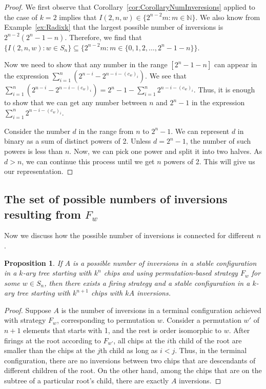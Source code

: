 \documentclass[final]{dmtcs-episciences}
\newtheorem{proposition}[theorem]{Proposition}
\theoremstyle{definition}
\theoremstyle{remark}
\begin{document}
\begin{proof}
We first observe that Corollary~\ref{cor:CorollaryNumInveresions} applied to the case of $k=2$ implies that $I(2, n, w) \in \{2^{n-2}m: m \in \mathbb{N}\}$. We also know from Example~\ref{ex:Radixk} that the largest possible number of inversions is $2^{n-2}(2^n-1-n)$. Therefore, we find that $\{I(2, n, w): w \in S_n\} \subseteq \{2^{n-2} m: m \in \{0, 1,2, \dots, 2^n-1-n\}\}$.

Now we need to show that any number in the range $[2^n-1-n]$ can appear in the expression $\sum_{i=1}^n (2^{n-i} - 2^{n-i-(c_w)_i})$.
We see that $\sum_{i=1}^n (2^{n-i} - 2^{n-i-(c_w)_i}) = 2^n-1 - \sum_{i=1}^n 2^{n-i-(c_w)_i}$. Thus, it is enough to show that we can get any number between $n$ and $2^n-1$ in the expression $\sum_{i=1}^n 2^{n-i-(c_w)_i}$.

Consider the number $d$ in the range from $n$ to $2^n-1$. We can represent $d$ in binary as a sum of distinct powers of 2. Unless $d=2^n-1$, the number of such powers is less than $n$. Now, we can pick one power and split it into two halves. As $d > n$, we can continue this process until we get $n$ powers of 2. This will give us our representation.
\end{proof}


\subsection{The set of possible numbers of inversions resulting from \texorpdfstring{$F_w$}{}}

Now we discuss how the possible number of inversions is connected for different $n$.

\begin{proposition}\label{prop:kAResult}
If $A$ is a possible number of inversions in a stable configuration in a $k$-ary tree starting with $k^n$ chips and using permutation-based strategy $F_w$ for some $w \in S_n$, then there exists a firing strategy and a stable configuration in a $k$-ary tree starting with $k^{n+1}$ chips with $kA$ inversions.
\end{proposition}

\begin{proof}
    Suppose $A$ is the number of inversions in a terminal configuration achieved with strategy $F_w$, corresponding to permutation $w$. Consider a permutation $w'$ of $n+1$ elements that starts with 1, and the rest is order isomorphic to $w$. After firings at the root according to $F_{w'}$, all chips at the $i$th child of the root are smaller than the chips at the $j$th child as long as $i < j$. Thus, in the terminal configuration, there are no inversions between two chips that are descendants of different children of the root. On the other hand, among the chips that are on the subtree of a particular root's child, there are exactly $A$ inversions.
\end{proof}
\end{document}
